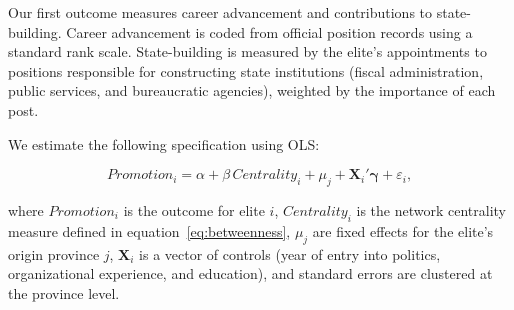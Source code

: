 
Our first outcome measures career advancement and contributions to
state-building. Career advancement is coded from official position records
using a standard rank scale. State-building is measured by the elite's
appointments to positions responsible for constructing state institutions
(fiscal administration, public services, and bureaucratic agencies), weighted
by the importance of each post.


We estimate the following specification using OLS:

\begin{equation}
Promotion_i = \alpha + \beta \, Centrality_i + \mu_j + \mathbf{X}_i'
\boldsymbol{\gamma} + \varepsilon_i ,
\label{eq:promotion}
\end{equation}

where $Promotion_i$ is the outcome for elite $i$, $Centrality_i$ is the
network centrality measure defined in equation~\eqref{eq:betweenness},
$\mu_j$ are fixed effects for the elite's origin province $j$, $\mathbf{X}_i$
is a vector of controls (year of entry into politics, organizational
experience, and education), and standard errors are clustered at the province
level.
